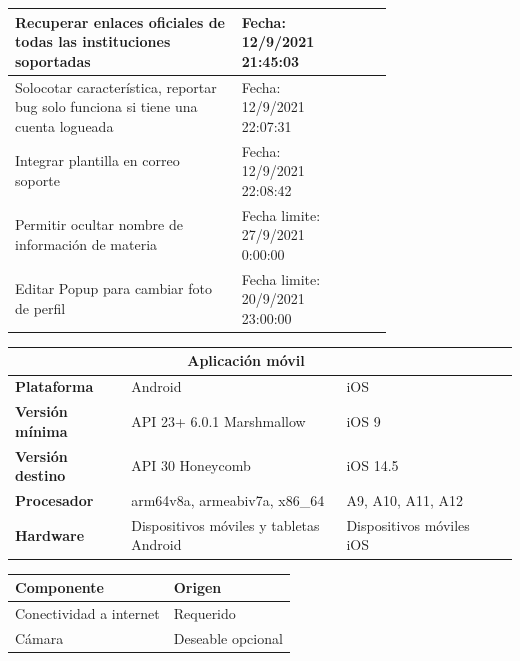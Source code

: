 \documentclass[10pt]{article}
\begin{document}
\begin{table}[H]
\begin{tabular}{|p{0.6\linewidth}|l |p{0.15\linewidth}|}
{Recuperar enlaces oficiales de todas las instituciones soportadas } & Fecha: 12/9/2021 21:45:03 \\ \hline
{Solocotar característica, reportar bug solo funciona si tiene una cuenta logueada } & Fecha: 12/9/2021 22:07:31  \\ \hline
{Integrar plantilla en correo soporte } & Fecha: 12/9/2021 22:08:42 \\ \hline
{Permitir ocultar nombre de información de materia } & Fecha limite: 27/9/2021 0:00:00 \\ \hline
{Editar Popup para cambiar foto de perfil } & Fecha limite: 20/9/2021 23:00:00 \\ \hline
\end{tabular}
\end{table}
\begin{table}[ht]
\centering
\begin{tabular}{|l |l |l |l |l |}
\hline
\multicolumn{3}{|c|}{\textbf{Aplicación móvil}} \\
\hline
\centering\textbf{Plataforma} & {Android} & {iOS} \\ \hline
\centering\textbf{Versión mínima} & {API 23+ 6.0.1 Marshmallow} & {iOS 9} \\ \hline
\centering\textbf{Versión destino} & {API 30 Honeycomb} & {iOS 14.5} \\ \hline
\centering\textbf{Procesador} & {arm64\-v8a, armeabi\-v7a, x86\_64} & {A9, A10, A11, A12} \\ \hline
\centering\textbf{Hardware} & {Dispositivos móviles y tabletas Android} & {Dispositivos móviles iOS}  \\ \hline
\end{tabular}
\end{table}
\begin{table}[H]
\begin{center}
\begin{tabular}{| l | l |}
\hline
\textbf{Componente} & \textbf{Origen} \\ \hline
Conectividad a internet & Requerido \\
Cámara & Deseable opcional \\ \hline
\end{tabular}
\end{center}
\end{table}
\end{document}
